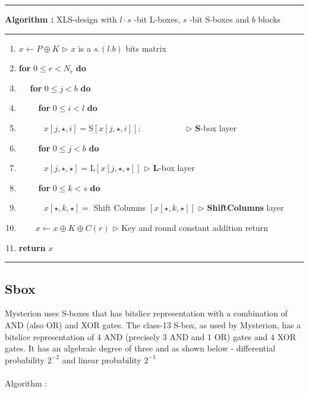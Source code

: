 \documentclass[preprint]{transcrypto}
\begin{document}
\hrule height 1pt  \relax \vspace{5pt}
{\centering
\noindent\textbf{Algorithm :} XLS-design with $l \cdot s$ -bit L-boxes, $s$ -bit S-boxes and $b$ blocks\\} \vspace{3pt}
\hrule \relax
\begin{enumerate}[label=\arabic*:]
	\item $x \leftarrow P \oplus K$  \hfill $\triangleright$ $x$   is a $s.(l . b)$  bits matrix
	\item \textbf{for} $0 \leq r<N_{r}$ \textbf{do}
	\item$\quad$ \textbf{for} $0 \leq j<b$ \textbf{do}
	\item$\quad\quad$ \textbf{for} $0 \leq i<l$ \textbf{do}
	\item$\quad\quad\quad x[j, \star, i]=\mathrm{S}[x[j, \star, i]] ; \quad \quad \quad \quad \quad$ \hfill $\triangleright$ \textbf{S}-box layer
	\item$\quad\quad$ \textbf{for} $0 \leq j<b$ \textbf{do}
	\item$\quad\quad\quad x[j, \star, \star]=\mathrm{L}[x[j, \star, \star]]$ \hfill $\triangleright$
	\textbf{L}-box layer
	\item$\quad\quad$ \textbf{for} $0 \leq k<s$ \textbf{do}
	\item$\quad\quad\quad x[\star, k, \star]=$ Shift Columns $[x[\star, k, \star]]$ \hfill $\triangleright$
	\textbf{ShiftColumns} layer
	\item$\quad\quad x \leftarrow x \oplus K \oplus C(r)$ \hfill $\triangleright$
	Key and round constant addition return
	\item \textbf{return} $x$
\end{enumerate}

\hrule \relax

\subsection{Sbox}

Mysterion uses S-boxes that has bitslice representation with a combination of AND (also OR) and XOR gates. The class-13 S-box, as used by Mysterion, has a bitslice representation of 4 AND (precisely 3 AND and 1 OR) gates and 4 XOR gates. It has an algebraic degree of three and as shown below - differential probability $2^{-2}$ and linear probability $2^{-1}$
\\\\
Algorithm :
\end{document}
